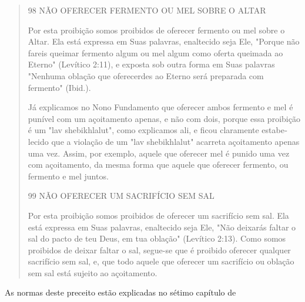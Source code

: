 \begin{quote}
98 NÃO OFERECER FERMENTO OU MEL SOBRE O ALTAR

Por esta proibição somos proibidos de oferecer fermento ou mel so­bre o
Altar. Ela está expressa em Suas palavras, enaltecido seja Ele, "Porque
não fareis queimar fermento algum ou mel algum como oferta queimada ao
Eter­no" (Levítico 2:11), e exposta sob outra forma em Suas palavras
"Nenhuma obla­ção que oferecerdes ao Eterno será preparada com fermento"
(Ibid.).

Já explicamos no Nono Fundamento que oferecer ambos fermento e mel é
punível com um açoitamento apenas, e não com dois, porque essa
proi­bição é um "lav shebikhlalut", como explicamos ali, e ficou
claramente estabe­lecido que a violação de um "lav shebikhlalut"
acarreta açoitamento apenas uma vez. Assim, por exemplo, aquele que
oferecer mel é punido uma vez com açoitamento, da mesma forma que aquele
que oferecer fermento, ou fermento e mel juntos.

99 NÃO OFERECER UM SACRIFÍCIO SEM SAL

Por esta proibição somos proibidos de oferecer um sacrifício sem sal.
Ela está expressa em Suas palavras, enaltecido seja Ele, "Não deixarás
faltar o sal do pacto de teu Deus, em tua oblação" (Levítico 2:13). Como
somos proi­bidos de deixar faltar o sal, segue-se que é proibido
oferecer qualquer sacrifício sem sal, e, que todo aquele que oferecer um
sacrifício ou oblação sem sal está sujeito ao açoitamento.
\end{quote}

As normas deste preceito estão explicadas no sétimo capítulo de

